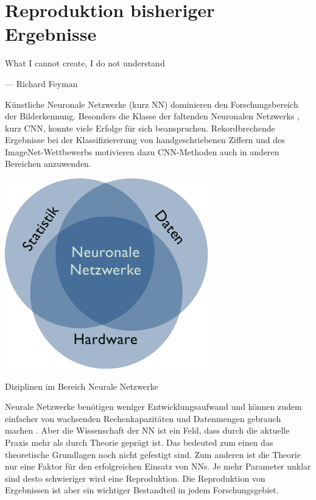 \chapter{Reproduktion bisheriger Ergebnisse}
\label{chap:reproduktion}
\epigraph{What I cannot create, I do not understand}{--- Richard Feyman}

Künstliche Neuronale Netzwerke (kurz NN) dominieren den Forschungsbereich der 
Bilderkennung. 
Besonders die Klasse der faltenden Neuronalen Netzwerks , kurz CNN, konnte viele Erfolge für sich beanspruchen.
Rekordbrechende Ergebnisse bei der Klassifiziererung von handgeschriebenen Ziffern \parencite{LeCunBackpropagationappliedhandwritten1989} und des ImageNet-Wettbewerbs \parencite{KrizhevskyImageNetClassificationDeep2012} motivieren dazu CNN-Methoden auch in anderen
Bereichen anzuwenden.

\begin{marginfigure}
    \includegraphics[width=\textwidth]{figures/tasks/nn_areas_venn.pdf}
    \caption{Diziplinen im Bereich Neurale Netzwerke}
    \label{fig:chen:cnn_task}
\end{marginfigure}
Neurale Netzwerke benötigen weniger Entwicklungsaufwand und können zudem einfacher von 
 wachsenden Rechenkapazitäten und Datenmengen gebrauch machen \parencite[436]{LeCunDeeplearning2015}. 
Aber die Wissenschaft der NN ist ein Feld, dass durch die aktuelle Praxis mehr als durch Theorie geprägt ist. 
Das bedeuted zum einen das theoretische Grundlagen noch nicht gefestigt sind.
Zum anderen ist die Theorie nur eine Faktor für den erfolgreichen Einsatz von NNs. 
Je mehr Parameter unklar sind desto schwieriger wird eine Reproduktion.
Die Reproduktion von Ergebnissen ist aber ein wichtiger Bestandteil in jedem Forschungsgebiet. 

